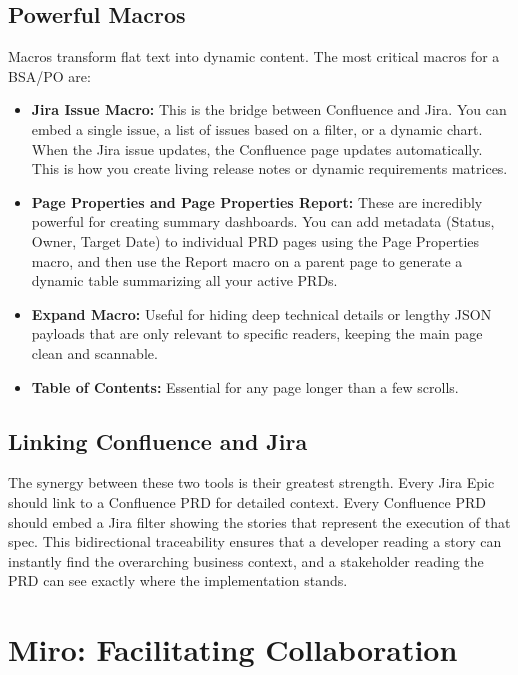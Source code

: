 \subsection{Powerful Macros}\label{powerful-macros}

Macros transform flat text into dynamic content. The most critical
macros for a BSA/PO are:

\begin{itemize}
\tightlist
\item
  \textbf{Jira Issue Macro:} This is the bridge between Confluence and
  Jira. You can embed a single issue, a list of issues based on a
  filter, or a dynamic chart. When the Jira issue updates, the
  Confluence page updates automatically. This is how you create living
  release notes or dynamic requirements matrices.
\item
  \textbf{Page Properties and Page Properties Report:} These are
  incredibly powerful for creating summary dashboards. You can add
  metadata (Status, Owner, Target Date) to individual PRD pages using
  the Page Properties macro, and then use the Report macro on a parent
  page to generate a dynamic table summarizing all your active PRDs.
\item
  \textbf{Expand Macro:} Useful for hiding deep technical details or
  lengthy JSON payloads that are only relevant to specific readers,
  keeping the main page clean and scannable.
\item
  \textbf{Table of Contents:} Essential for any page longer than a few
  scrolls.
\end{itemize}

\subsection{Linking Confluence and
Jira}\label{linking-confluence-and-jira}

The synergy between these two tools is their greatest strength. Every
Jira Epic should link to a Confluence PRD for detailed context. Every
Confluence PRD should embed a Jira filter showing the stories that
represent the execution of that spec. This bidirectional traceability
ensures that a developer reading a story can instantly find the
overarching business context, and a stakeholder reading the PRD can see
exactly where the implementation stands.

\section{Miro: Facilitating
Collaboration}\label{miro-facilitating-collaboration}


